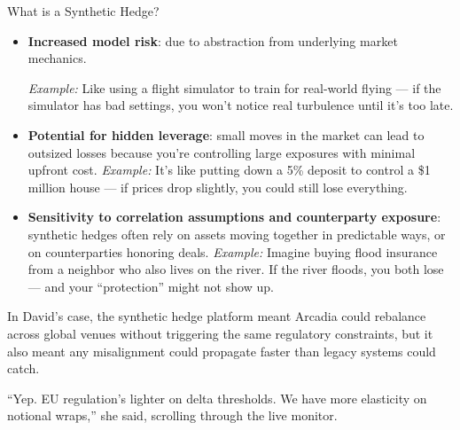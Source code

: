 \begin{TechnicalSidebar}{What is a Synthetic Hedge?}
  \medskip

  \begin{itemize}
    \item \textbf{Increased model risk}: due to abstraction from underlying market mechanics.  

    \medskip
    \textit{Example:} Like using a flight simulator to train for real-world flying — if the simulator has bad settings, you won’t notice real turbulence until it’s too late.
    \medskip
  
    \item \textbf{Potential for hidden leverage}: small moves in the market can lead to outsized losses because you're controlling large exposures with minimal upfront cost.  
    \medskip
    \textit{Example:} It's like putting down a 5\% deposit to control a \$1 million house — if prices drop slightly, you could still lose everything.
    \medskip
  
    \item \textbf{Sensitivity to correlation assumptions and counterparty exposure}: synthetic hedges often rely on assets moving together in predictable ways, or on counterparties honoring deals.  
    \medskip
    \textit{Example:} Imagine buying flood insurance from a neighbor who also lives on the river. If the river floods, you both lose — and your “protection” might not show up.
  \end{itemize}
  

  \medskip

  In David’s case, the synthetic hedge platform meant Arcadia could rebalance across global venues without triggering 
  the same regulatory constraints, but it also meant any misalignment could propagate faster than legacy systems 
  could catch.

\end{TechnicalSidebar}

\medskip

``Yep. EU regulation’s lighter on delta thresholds. We have more elasticity on notional wraps,'' she said, 
scrolling through the live monitor.


\medskip

